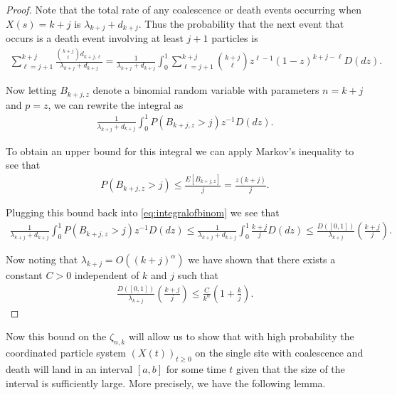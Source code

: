 \documentclass[11pt]{article}
\theoremstyle{definition}
\begin{document}
\begin{proof}
   Note that the total rate of any coalescence or death events occurring when $X(s) = k+j$ is $\lambda_{k+j} +d_{k+j}$. Thus the probability that the next event that occurs is a death event involving at least $j + 1$ particles is
   \begin{align*}
       \sum_{\ell = j+1}^{k+j} \frac{\binom{k+j}{\ell}d_{k+j, \ell}}{\lambda_{k+j} +d_{k+j}} = \frac{1}{\lambda_{k+j} +d_{k+j}}\int_0^1\sum_{\ell = j+1}^{k+j}\binom{k+j}{\ell}z^{\ell-1}(1-z)^{k+j-\ell} D(dz).
   \end{align*}

   \noindent Now letting $B_{k+j,z}$ denote a binomial random variable with parameters $n= k+j$ and $p=z$, we can rewrite the integral as
   \begin{align}\label{eq:integralofbinom}
        \frac{1}{\lambda_{k+j} +d_{k+j}}\int_0^1 P(B_{k+j,z} > j)  z^{-1}D(dz).
   \end{align}

   \noindent To obtain an upper bound for this integral we can apply Markov's inequality to see that
   \begin{align*}
        P(B_{k+j,z} > j) \leq \frac{E[B_{k+j, z}]}{j} = \frac{z(k+j)}{j}.
   \end{align*}

   \noindent Plugging this bound back into \eqref{eq:integralofbinom} we see that
   \begin{align*}
       \frac{1}{\lambda_{k+j} +d_{k+j}}\int_0^1 P(B_{k+j,z} > j)  z^{-1}D(dz) \leq \frac{1}{\lambda_{k+j} +d_{k+j}}\int_0^1\frac{k+j}{j}D(dz) \leq \frac{D([0,1])}{\lambda_{k+j}}\left( \frac{k+j}{j}\right).
   \end{align*}
   
   \noindent Now noting that $\lambda_{k + j} = O((k+j)^\alpha)$ we have shown that there exists a constant $C > 0$ independent of $k$ and $j$ such that 
   \begin{align*}
       \frac{D([0,1])}{\lambda_{k+j}}\left( \frac{k+j}{j}\right) \leq \frac{C}{k^\alpha}\left(1 + \frac{k}{j}\right).
   \end{align*}

   \noindent 
\end{proof}

\noindent Now this bound on the $\zeta_{n,k}$ will allow us to show that with high probability the coordinated particle system $(X(t))_{t \geq 0}$ on the single site with coalescence and death will land in an interval $[a,b]$ for some time $t$ given that the size of the interval is sufficiently large. More precisely, we have the following lemma.
\end{document}
